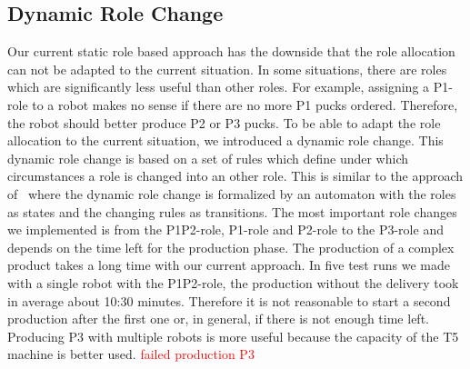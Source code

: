 \subsection{Dynamic Role Change}
Our current static role based approach has the downside that the role allocation can not be adapted to the current situation. In some situations, there are roles which are significantly less useful than other roles. For example, assigning a P1-role to a robot makes no sense if there are no more P1 pucks ordered. Therefore, the robot should better produce P2 or P3 pucks. To be able to adapt the role allocation to the current situation, we introduced a dynamic role change. This dynamic role change is based on a set of rules which define under which circumstances a role is changed into an other role. This is similar to the approach of~\cite{dynamic_role_assignment} where the dynamic role change is formalized by an automaton with the roles as states and the changing rules as transitions. The most important role changes we implemented is from the P1P2-role, P1-role and P2-role to the P3-role and depends on the time left for the production phase. The production of a complex product takes a long time with our current approach. In five test runs we made with a single robot with the P1P2-role, the production without the delivery took in average about 10:30 minutes. Therefore it is not reasonable to start a second production after the first one or, in general, if there is not enough time left. Producing P3 with multiple robots is more useful because the capacity of the T5 machine is better used.
\textcolor{red}{failed production  P3}
